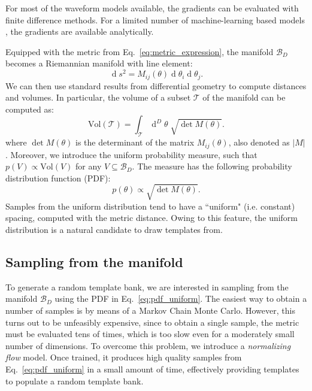 \documentclass[twocolumn,showpacs,preprintnumbers,nofootinbib,prd,
superscriptaddress,10pt]{revtex4-2}
\renewcommand{\d}[1]{\ensuremath{\operatorname{d}\!{#1}}}
\newcommand{\dvol}[2]{\ensuremath{\operatorname{d}^{#2}\!{#1}}}
\begin{document}
For most of the waveform models available, the gradients can be evaluated with finite difference methods. For a limited number of machine-learning based models \cite{Chua:2018woh, Khan:2020fso, PhysRevD.103.043020, Thomas:2022rmc, Tissino:2022thn}, the gradients are available analytically.

Equipped with the metric from Eq.~\eqref{eq:metric_expression}, the manifold $\mathcal{B}_D$ becomes a Riemannian manifold with line element:
\begin{equation}\label{eq:line_element}
	\d{s^2} = M_{ij}(\theta) \d{\theta_i} \d{\theta_j}.
\end{equation}
We can then use standard results from differential geometry to compute distances and volumes. In particular, the volume of a subset $\mathcal{T}$ of the manifold can be computed as:
\begin{equation}\label{eq:volume_tile}
	\text{Vol}(\mathcal{T}) = \int_\mathcal{T} \dvol{\theta}{D} \; \sqrt{\det M(\theta)}.
\end{equation}
where $\det M(\theta)$ is the determinant of the matrix $M_{ij}(\theta)$, also denoted as $|M|$.
%
Moreover, we introduce the uniform probability measure, such that $p(V) \propto \text{Vol}(V)$ for any $V\subseteq \mathcal{B}_D$. The measure has the following probability distribution function (PDF):
\begin{equation}\label{eq:pdf_uniform}
	p(\theta) \propto \sqrt{\det M(\theta)}.
\end{equation}
Samples from the uniform distribution tend to have a ``uniform" (i.e. constant) spacing, computed with the metric distance. Owing to this feature, the uniform distribution is a natural candidate to draw templates from.

\subsection{Sampling from the manifold} \label{sec:normalizing_flow}

To generate a random template bank, we are interested in sampling from the manifold $\mathcal{B}_D$ using the PDF in Eq.~\eqref{eq:pdf_uniform}.
The easiest way to obtain a number of samples is by means of a Markov Chain Monte Carlo. However, this turns out to be unfeasibly expensive, since to obtain a single sample, the metric must be evaluated tens of times, which is too slow even for a moderately small number of dimensions.
To overcome this problem, we introduce a {\it normalizing flow} model. Once trained, it produces high quality samples from Eq.~\eqref{eq:pdf_uniform} in a small amount of time, effectively providing templates to populate a random template bank.
\end{document}
